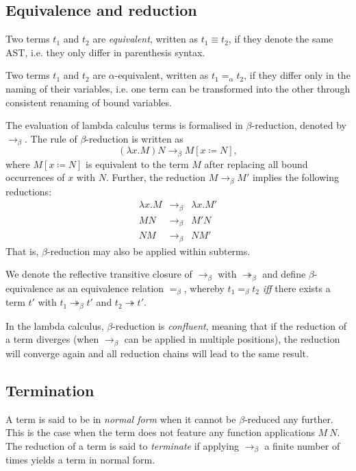 \subsection{Equivalence and reduction}
Two terms $t_1$ and $t_2$ are \emph{equivalent}, written as $t_1 \equiv t_2$, if they
denote the same AST, i.e. they only differ in parenthesis syntax.

Two terms $t_1$ and $t_2$ are $\alpha$-equivalent, written as $t_1 =_\alpha t_2$, if
they differ only in the naming of their variables, i.e. one term can be transformed
into the other through consistent renaming of bound variables.

The evaluation of lambda calculus terms is formalised in $\beta$-reduction, denoted
by $\to_\beta$.
The rule of $\beta$-reduction is written as
\[ (\lambda x. M) N \to_\beta M[x \coloneqq N], \]
where $M[x \coloneqq N]$ is equivalent to the term $M$ after replacing all bound
occurrences of $x$ with $N$.
Further, the reduction $M \to_\beta M'$ implies the following reductions:
\[
\begin{array}{ccc}
  \lambda x. M &\to_\beta& \lambda x. M' \\
  M N &\to_\beta& M' N \\
  N M &\to_\beta& N M'
\end{array}
\]
%
That is, $\beta$-reduction may also be applied within subterms.

We denote the reflective transitive closure of $\to_\beta$ with
$\twoheadrightarrow_\beta$ and define $\beta$-equivalence as an equivalence relation
$=_\beta$, whereby $t_1 =_\beta t_2$ \emph{iff} there exists a term $t'$ with
$t_1 \twoheadrightarrow_\beta t'$ and $t_2 \twoheadrightarrow t'$.

In the lambda calculus, $\beta$-reduction is \emph{confluent}, meaning that if the
reduction of a term diverges (when $\to_\beta$ can be applied in multiple positions),
the reduction will converge again and all reduction chains will lead to the same result.

\subsection{Termination}
A term is said to be in \emph{normal form} when it cannot be $\beta$-reduced any further.
This is the case when the term does not feature any function applications $M\ N$.
The reduction of a term is said to \emph{terminate} if applying $\to_\beta$ a finite
number of times yields a term in normal form.

